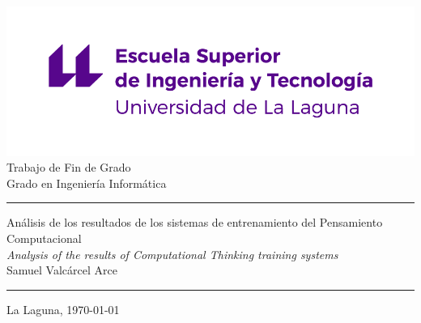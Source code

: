 \documentclass[spanish,a4paper,14pt,oneside]{extreport}
\begin{document}
   
   
  \pagestyle{empty}
  \thispagestyle{empty}
   
   
  \newcommand{\HRule}{\rule{\linewidth}{1mm}}
  \setlength{\parindent}{0mm}
  \setlength{\parskip}{2.5mm}
   
   
  \begin{center}
  \includegraphics[scale=0.8]{images/logo_nuevo}\\[10mm]
  {\Huge Trabajo de Fin de Grado}\\
  \bigskip
  {\LARGE Grado en Ingeniería Informática}\\
  \end{center}
   
  \HRule
  \begin{flushright}
         {\Huge Análisis de los resultados de los sistemas de entrenamiento del Pensamiento Computacional} \\[2.5mm]
         {\Large \textit{Analysis of the results of Computational Thinking training systems}} \\[5mm]
         {\Large Samuel Valcárcel Arce} \\[5mm]
  \end{flushright}
  \HRule
  \begin{center}
   \Large La Laguna, \today
  \end{center}
   
  \setlength{\parindent}{5mm}
   
  \newpage
  \thispagestyle{empty}
   
\end{document}
